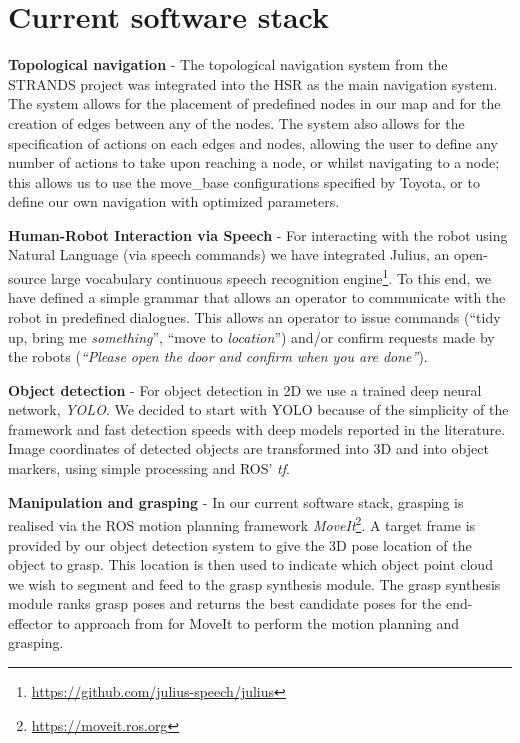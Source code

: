 \documentclass[runningheads,a4paper]{llncs}
\begin{document}
\section{Current software stack}
\textbf{Topological navigation} - The topological navigation system from the STRANDS project was integrated into the HSR as the main navigation system. The system allows for the placement of predefined nodes in our map and for the creation of edges between any of the nodes. The system also allows for the specification of actions on each edges and nodes, allowing the user to define any number of actions to take upon reaching a node, or whilst navigating to a node; this allows us to use the move\_base configurations specified by Toyota, or to define our own navigation with optimized parameters. 

\textbf{Human-Robot Interaction via Speech} - For interacting with the robot using Natural Language (via speech commands) we have integrated Julius, an open-source large vocabulary continuous speech recognition engine\footnote{\url{https://github.com/julius-speech/julius}}. To this end, we have defined a simple grammar that allows an operator to communicate with the robot in predefined dialogues. This allows an operator to issue commands (``tidy up, bring me \emph{something}'', ``move to \emph{location}'') and/or confirm requests made by the robots (\emph{``Please open the door and confirm when you are done''}).  

\textbf{Object detection} - For object detection in 2D we use a trained deep neural network, \textit{YOLO}. We decided to start with YOLO because of the simplicity of the framework and fast detection speeds with deep models reported in the literature. Image coordinates of detected objects are transformed into 3D  and into object markers, using simple processing and ROS' \textit{tf}.  

\textbf{Manipulation and grasping} - In our current software stack, grasping is realised via the ROS motion planning framework \textit{MoveIt}\footnote{\url{https://moveit.ros.org}}. A target frame is provided by our object detection system to give the 3D pose location of the object to grasp. This location is then used to indicate which object point cloud we wish to segment and feed to the grasp synthesis module. The grasp synthesis module ranks grasp poses and returns the best candidate poses for the end-effector to approach from for MoveIt to perform the motion planning and grasping. 
\end{document}
